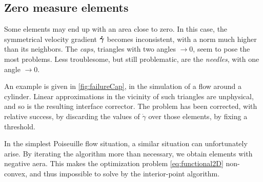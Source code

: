 \documentclass[11 pt]{report}
\begin{document}
\subsection{Zero measure elements}
Some elements may end up with an area close to zero. In this case, the symmetrical velocity gradient $\boldsymbol{\dot \gamma}$ becomes inconsistent, with a norm much higher than its neighbors. The \textit{caps}, triangles with two angles $\to 0$, seem to pose the most problems. Less troublesome, but still problematic, are the \textit{needles}, with one angle $\to 0$. 

An example is given in \cref{fig:failureCap}, in the simulation of a flow around a cylinder. Linear approximations in the vicinity of such triangles are unphysical, and so is the resulting interface corrector. The problem has been corrected, with relative success, by discarding the values of $\dot \gamma$ over those elements, by fixing a threshold.

In the simplest Poiseuille flow situation, a similar situation can unfortunately arise. By iterating the algorithm more than necessary, we obtain elements with negative aera. This makes the optimization problem \eqref{eq:functional2D} non-convex, and thus impossible to solve by the interior-point algorithm.
\end{document}

